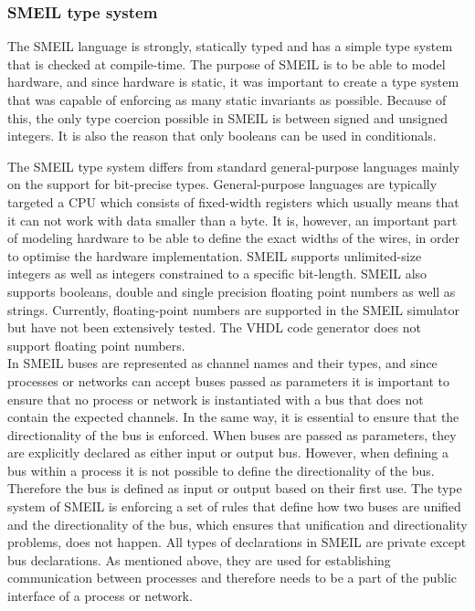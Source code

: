 \subsubsection{SMEIL type system}
The SMEIL language is strongly, statically typed and has a simple type system that is checked at compile-time. The purpose of SMEIL is to be able to model hardware, and since hardware is static, it was important to create a type system that was capable of enforcing as many static invariants as possible.
Because of this, the only type coercion possible in SMEIL is between signed and unsigned integers. It is also the reason that only booleans can be used in conditionals.

The SMEIL type system differs from standard general-purpose languages mainly on the support for bit-precise types. General-purpose languages are typically targeted a CPU which consists of fixed-width registers which usually means that it can not work with data smaller than a byte. It is, however, an important part of modeling hardware to be able to define the exact widths of the wires, in order to optimise the hardware implementation. SMEIL supports unlimited-size integers as well as integers constrained to a specific bit-length. SMEIL also supports booleans, double and single precision floating point numbers as well as strings. Currently, floating-point numbers are supported in the SMEIL simulator but have not been extensively tested. The VHDL code generator does not support floating point numbers. \\

In SMEIL buses are represented as channel names and their types, and since processes or networks can accept buses passed as parameters it is important to ensure that no process or network is instantiated with a bus that does not contain the expected channels.
In the same way, it is essential to ensure that the directionality of the bus is enforced. When buses are passed as parameters, they are explicitly declared as either input or output bus. However, when defining a bus within a process it is not possible to define the directionality of the bus. Therefore the bus is defined as input or output based on their first use.
The type system of SMEIL is enforcing a set of rules that define how two buses are unified and the directionality of the bus, which ensures that unification and directionality problems, does not happen.
All types of declarations in SMEIL are private except bus declarations. As mentioned above, they are used for establishing communication between processes and therefore needs to be a part of the public interface of a process or network.

